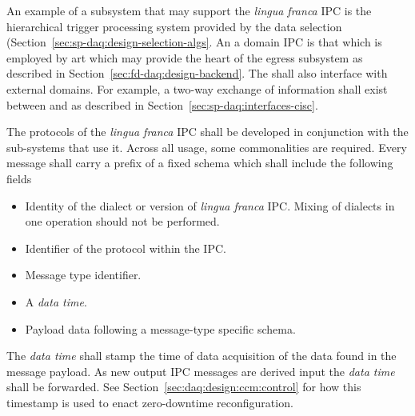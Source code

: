 An example of a subsystem that may support the \textit{lingua franca} IPC is the hierarchical trigger processing system provided by the data selection (Section~\ref{sec:sp-daq:design-selection-algs}. 
An a domain IPC is that which is employed by art which may provide the heart of the egress subsystem as described in Section~\ref{sec:fd-daq:design-backend}.
The  shall also interface with external domains. 
For example, a two-way exchange of information shall exist between  and  as described in Section~\ref{sec:sp-daq:interfaces-cisc}.  

The protocols of the \textit{lingua franca} IPC shall be developed in conjunction with the  sub-systems that use it. 
Across all usage, some commonalities are required. 
Every message shall carry a prefix of a fixed schema which shall include the following fields

\begin{itemize}
\item Identity of the dialect or version of \textit{lingua franca} IPC.  Mixing of dialects in one operation should not be performed.
\item Identifier of the protocol within the IPC.
\item Message type identifier.
\item A \textit{data time}.
\item Payload data following a message-type specific schema.
\end{itemize}

The \textit{data time} shall stamp the time of data acquisition of the data found in the message payload. 
As new output IPC messages are derived input the \textit{data time} shall be forwarded.
See Section~\ref{sec:daq:design:ccm:control} for how this timestamp is used to enact zero-downtime reconfiguration.




